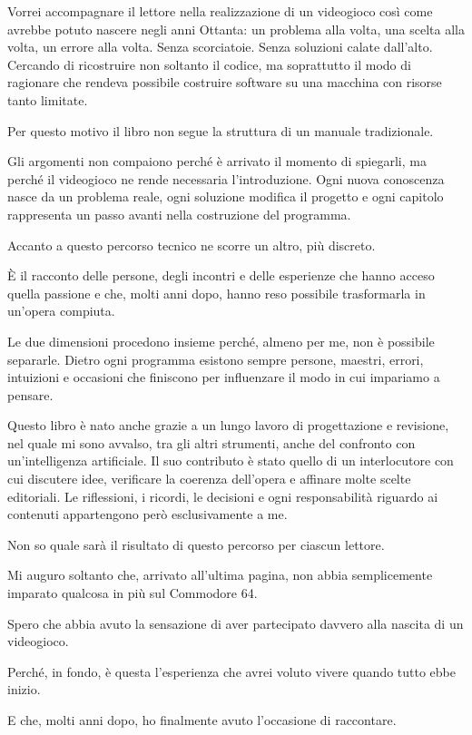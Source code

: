 \documentclass{article}
\begin{document}
Vorrei accompagnare il lettore nella realizzazione di un videogioco così come avrebbe potuto nascere negli anni Ottanta:
un problema alla volta, una scelta alla volta, un errore alla volta. Senza scorciatoie. Senza soluzioni calate
dall'alto. Cercando di ricostruire non soltanto il codice, ma soprattutto il modo di ragionare che rendeva possibile
costruire software su una macchina con risorse tanto limitate.

Per questo motivo il libro non segue la struttura di un manuale tradizionale.

Gli argomenti non compaiono perché è arrivato il momento di spiegarli, ma perché il videogioco ne rende necessaria
l'introduzione. Ogni nuova conoscenza nasce da un problema reale, ogni soluzione modifica il progetto e ogni capitolo
rappresenta un passo avanti nella costruzione del programma.

Accanto a questo percorso tecnico ne scorre un altro, più discreto.

È il racconto delle persone, degli incontri e delle esperienze che hanno acceso quella passione e che, molti anni dopo,
hanno reso possibile trasformarla in un'opera compiuta.

Le due dimensioni procedono insieme perché, almeno per me, non è possibile separarle. Dietro ogni programma esistono
sempre persone, maestri, errori, intuizioni e occasioni che finiscono per influenzare il modo in cui impariamo a
pensare.

Questo libro è nato anche grazie a un lungo lavoro di progettazione e revisione, nel quale mi sono avvalso, tra gli
altri strumenti, anche del confronto con un'intelligenza artificiale. Il suo contributo è stato quello di un
interlocutore con cui discutere idee, verificare la coerenza dell'opera e affinare molte scelte editoriali. Le
riflessioni, i ricordi, le decisioni e ogni responsabilità riguardo ai contenuti appartengono però esclusivamente a me.

Non so quale sarà il risultato di questo percorso per ciascun lettore.

Mi auguro soltanto che, arrivato all'ultima pagina, non abbia semplicemente imparato qualcosa in più sul Commodore 64.

Spero che abbia avuto la sensazione di aver partecipato davvero alla nascita di un videogioco.

Perché, in fondo, è questa l'esperienza che avrei voluto vivere quando tutto ebbe inizio.

E che, molti anni dopo, ho finalmente avuto l'occasione di raccontare.


\bigskip
\end{document}
